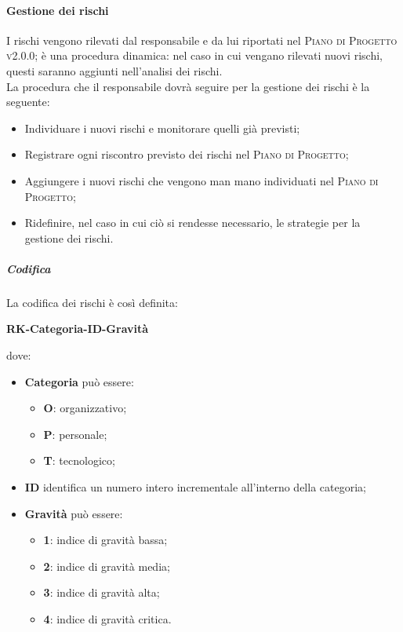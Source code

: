 \documentclass[../norme-di-progetto.tex]{subfiles}
\begin{document}
\paragraph{Gestione dei rischi}
I rischi vengono rilevati dal responsabile e da lui riportati nel \textsc{Piano di Progetto v2.0.0}; è una procedura dinamica: nel caso in cui vengano rilevati nuovi rischi, questi saranno aggiunti nell'analisi dei rischi. \\
La procedura che il responsabile dovrà seguire per la gestione dei rischi è la seguente:
\begin{itemize}
  \item Individuare i nuovi rischi e monitorare quelli già previsti;
  \item Registrare ogni riscontro previsto dei rischi nel \textsc{Piano di Progetto};
  \item Aggiungere i nuovi rischi che vengono man mano individuati nel \textsc{Piano di Progetto};
  \item Ridefinire, nel caso in cui ciò si rendesse necessario, le strategie per la gestione dei rischi.
\end{itemize}
\subparagraph*{Codifica}
La codifica dei rischi è così definita: \\
\begin{center}
\centering
\textbf{RK-Categoria-ID-Gravità}
\end{center} dove:
\begin{itemize}
  \item \textbf{Categoria} può essere:
  \begin{itemize}
    \item \textbf{O}: organizzativo;
    \item \textbf{P}: personale;
    \item \textbf{T}: tecnologico;
  \end{itemize}
  \item \textbf{ID} identifica un numero intero incrementale all'interno della categoria;
  \item \textbf{Gravità} può essere:
  \begin{itemize}
    \item \textbf{1}: indice di gravità bassa;
    \item \textbf{2}: indice di gravità media;
    \item \textbf{3}: indice di gravità alta;
    \item \textbf{4}: indice di gravità critica.
  \end{itemize}
\end{itemize}
\end{document}

